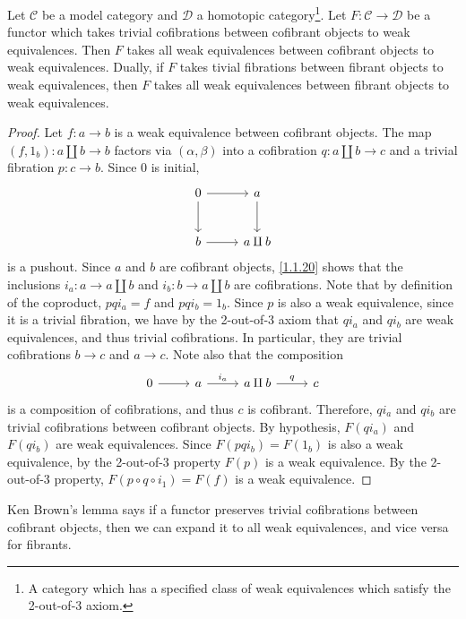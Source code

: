\begin{lemma}\label{1.1.21}
	Let $\mathcal{C} $ be a model category and $\mathcal{D} $ a homotopic category\footnote{A category which has a specified class of weak equivalences which satisfy the 2-out-of-3 axiom.}. Let $F : \mathcal{C}  \to \mathcal{D} $ be a functor which takes trivial cofibrations between cofibrant objects to weak equivalences. Then $F$ takes all weak equivalences between cofibrant objects to weak equivalences. Dually, if $F$ takes tivial fibrations between fibrant objects to weak equivalences, then $F$ takes all weak equivalences between fibrant objects to weak equivalences.
\end{lemma}
\begin{proof}
	Let $f : a \to b$ is a weak equivalence between cofibrant objects. The map $(f,1_b): a\amalg b \to b$ factors via $(\alpha,\beta)$ into a cofibration $q : a\amalg b \to c$ and a trivial fibration $p : c \to b$. Since $0$ is initial,
	\[\begin{tikzcd}[row sep = 2.5em, column sep = 2.5em]
	0 \ar[r]\ar[d]  & a\ar[d]  \\
	b \ar[r]  & a\amalg b
	\end{tikzcd}\]
	is a pushout. Since $a$ and $b$ are cofibrant objects, \cref{1.1.20} shows that the inclusions $i_a : a \to a\amalg b$ and $i_b : b \to a\amalg b$ are cofibrations. Note that by definition of the coproduct, $pqi_a=f$ and $pqi_b=1_b$. Since $p$ is also a weak equivalence, since it is a trivial fibration, we have by the 2-out-of-3 axiom that $qi_a$ and $qi_b$ are weak equivalences, and thus trivial cofibrations. In particular, they are trivial cofibrations $b\to c$ and $a\to c$. Note also that the composition
	\[\begin{tikzcd}[row sep = 2.5em, column sep = 2.5em]
		0 \ar[r]  & a\ar[" i_a ", r]  & a\amalg b \ar[" q ", r] & c
	\end{tikzcd}\]
	is a composition of cofibrations, and thus $c$ is cofibrant. Therefore, $qi_a$ and $qi_b$ are trivial cofibrations between cofibrant objects. By hypothesis, $F(qi_a)$ and $F(qi_b)$ are weak equivalences. Since $F(pqi_b)=F(1_b)$ is also a weak equivalence, by the 2-out-of-3 property $F(p)$ is a weak equivalence. By the 2-out-of-3 property, $F(p\circ q\circ i_1)=F(f)$ is a weak equivalence.
\end{proof}

\begin{intuition}\label{1.1.22}
	Ken Brown's lemma says if a functor preserves trivial cofibrations between cofibrant objects, then we can expand it to all weak equivalences, and vice versa for fibrants.
\end{intuition}

